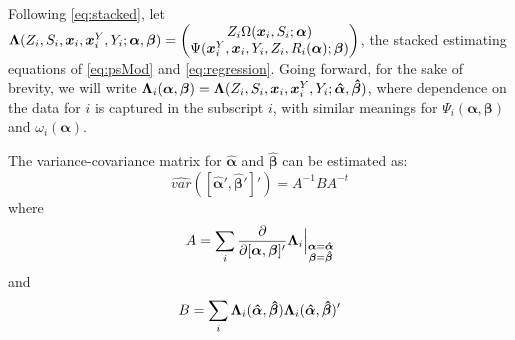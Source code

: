 \documentclass[]{article}
\begin{document}
\sloppy
Following \eqref{eq:stacked}, let $\bm{\Lambda}(Z_i,S_i,\bm{x}_i,\bm{x}^Y_i,Y_i;\bm{\alpha},\bm{\beta})=\begin{pmatrix} Z_i\Omega(\bm{x}_i,S_i;\bm{\alpha})\\ \Psi(\bm{x}^Y_i,\bm{x}_i,Y_i,Z_i,R_i(\bm{\alpha});\bm{\beta})\end{pmatrix}$, the stacked estimating equations of \eqref{eq:psMod} and \eqref{eq:regression}.
Going forward, for the sake of brevity, we will write $\bm{\Lambda}_i(\bm{\alpha},\bm{\beta})=\bm{\Lambda}(Z_i,S_i,\bm{x}_i,\bm{x}^Y_i,Y_i;\bm{\hat{\alpha}},\bm{\hat{\beta}})$, where dependence on the data for $i$ is captured in the subscript $i$, with similar meanings for $\Psi_i(\bm{\alpha},\bm{\beta})$ and $\omega_i(\bm{\alpha})$.


The variance-covariance matrix for $\bm{\hat{\alpha}}$ and $\bm{\hat{\beta}}$ can be estimated as:
\begin{equation*}
  \widehat{var}\left([\bm{\hat{\alpha}}',\bm{\hat{\beta}}']'\right)=A^{-1}BA^{-t}
\end{equation*}
where
\begin{equation*}%
  A=\sum_i \frac{\partial}{\partial [\bm{\alpha},\bm{\beta}]'} \blam_i\Bigr|_{\substack{\bm{\alpha}=\bm{\hat{\alpha}}\\\bm{\beta}=\bm{\hat{\beta}}}}
\end{equation*}
and
\begin{equation*}%
  B=\sum_i \blam_i(\bm{\hat{\alpha}},\bm{\hat{\beta}})\blam_i(\bm{\hat{\alpha}},\bm{\hat{\beta}})'
\end{equation*}
\end{document}
